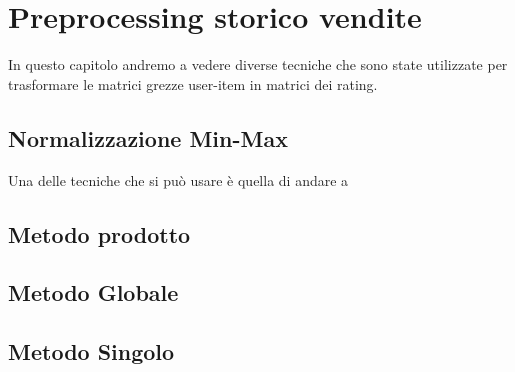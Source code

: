
\hypertarget{(chap:capitolo5)}{}
\chapter{Preprocessing storico vendite}
In questo capitolo andremo a vedere diverse tecniche che sono state utilizzate per trasformare le matrici grezze user-item in matrici dei rating.\\

\section{Normalizzazione Min-Max}
Una delle tecniche che si può usare è quella di andare a 

\section{Metodo prodotto}

\section{Metodo Globale}

\section{Metodo Singolo}